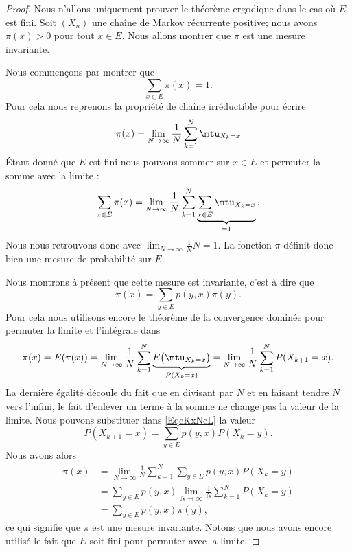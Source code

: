 \begin{proof}
    Nous n'allons uniquement prouver le théorème ergodique dans le cas où \( E\) est fini. Soit \( (X_n)\) une chaîne de Markov récurrente positive; nous avons \( \pi(x)>0\) pour tout \( x\in E\). Nous allons montrer que \( \pi\) est une mesure invariante.

    Nous commençons par montrer que
    \begin{equation}
        \sum_{x\in E}\pi(x)=1.
    \end{equation}
    Pour cela nous reprenons la propriété de chaîne irréductible pour écrire
    \begin{equation}
        \pi(x)=\lim_{N\to \infty}\frac{1}{ N }\sum_{k=1}^N\mtu_{X_k=x}
    \end{equation}
    Étant donné que \( E\) est fini nous pouvons sommer sur \( x\in E\) et permuter la somme avec la limite :
    \begin{equation}
        \sum_{x\in E}\pi(x)=\lim_{N\to \infty} \frac{1}{ N }\sum_{k=1}^N\underbrace{\sum_{x\in E}\mtu_{X_k=x}}_{=1}.
    \end{equation}
    Nous nous retrouvons donc avec \( \lim_{N\to \infty} \frac{1}{ N }N=1\). La fonction \( \pi\) définit donc bien une mesure de probabilité sur \( E\).

    Nous montrons à présent que cette mesure est invariante, c'est à dire que
    \begin{equation}
        \pi(x)=\sum_{y\in E}p(y,x)\pi(y).
    \end{equation}
    Pour cela nous utilisons encore le théorème de la convergence dominée pour permuter la limite et l'intégrale dans
    \begin{equation}        \label{EqcKxNcL}
        \pi(x)=E(\pi(x))=\lim_{N\to \infty} \frac{1}{ N }\sum_{k=1}^N\underbrace{E\big( \mtu_{X_k=x} \big)}_{P(X_k=x)}=\lim_{N\to \infty} \frac{1}{ N }\sum_{k=1}^NP(X_{k+1}=x).
    \end{equation}
    La dernière égalité découle du fait que en divisant par \( N\) et en faisant tendre \( N\) vers l'infini, le fait d'enlever un terme à la somme ne change pas la valeur de la limite. Nous pouvons substituer dans \eqref{EqcKxNcL} la valeur
    \begin{equation}
        P(X_{k+1}=x)=\sum_{y\in E}p(y,x)P(X_k=y).
    \end{equation}
    Nous avons alors
    \begin{subequations}
        \begin{align}
            \pi(x)&=\lim_{N\to \infty} \frac{1}{ N }\sum_{k=1}^N\sum_{y\in E}p(y,x)P(X_k=y)\\
            &=\sum_{y\in E}p(y,x)\lim_{N\to \infty} \frac{1}{ N }\sum_{k=1}^NP(X_k=y)\\
            &=\sum_{y\in E}p(y,x)\pi(y),
        \end{align}
    \end{subequations}
    ce qui signifie que \( \pi\) est une mesure invariante. Notons que nous avons encore utilisé le fait que \( E\) soit fini pour permuter avec la limite.


\end{proof}
